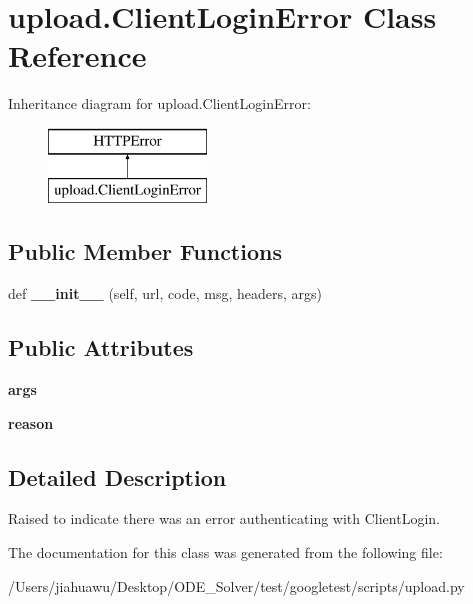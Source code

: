 \hypertarget{classupload_1_1_client_login_error}{}\section{upload.\+Client\+Login\+Error Class Reference}
\label{classupload_1_1_client_login_error}
Inheritance diagram for upload.\+Client\+Login\+Error\+:\begin{figure}[H]
\begin{center}
\leavevmode
\includegraphics[height=2.000000cm]{classupload_1_1_client_login_error}
\end{center}
\end{figure}
\subsection*{Public Member Functions}
\begin{DoxyCompactItemize}
\item 
\mbox{\label{classupload_1_1_client_login_error_a1e590616c2976d881e155958cedbbe47}} 
def {\bfseries \+\_\+\+\_\+init\+\_\+\+\_\+} (self, url, code, msg, headers, args)
\end{DoxyCompactItemize}
\subsection*{Public Attributes}
\begin{DoxyCompactItemize}
\item 
\mbox{\label{classupload_1_1_client_login_error_ac300a0b034b2bc64cedc51e09fb6d663}} 
{\bfseries args}
\item 
\mbox{\label{classupload_1_1_client_login_error_ae0555feb182d89d1e4d7944afbfe14e5}} 
{\bfseries reason}
\end{DoxyCompactItemize}


\subsection{Detailed Description}
\begin{DoxyVerb}Raised to indicate there was an error authenticating with ClientLogin.\end{DoxyVerb}
 

The documentation for this class was generated from the following file\+:\begin{DoxyCompactItemize}
\item 
/\+Users/jiahuawu/\+Desktop/\+O\+D\+E\+\_\+\+Solver/test/googletest/scripts/upload.\+py\end{DoxyCompactItemize}
